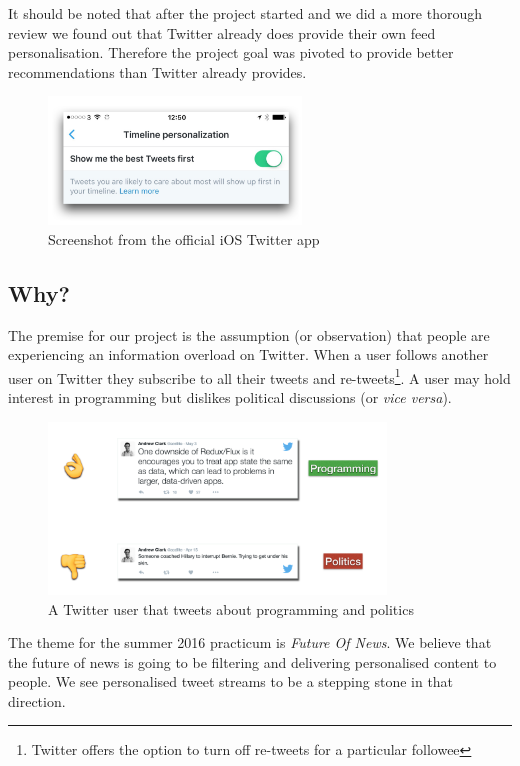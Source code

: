 \documentclass{article}
\begin{document}
\noindent It should be noted that after the project started and we did a more thorough review we found out that Twitter already does provide their own feed personalisation. Therefore the project goal was pivoted to provide better recommendations than Twitter already provides.

\begin{figure}[H]
    \centering
    \includegraphics[width=0.6\textwidth]{tp}  
    \caption{Screenshot from the official iOS Twitter app}
\end{figure}


\subsection{Why?}
The premise for our project is the assumption (or observation) that people are experiencing an information overload on Twitter. When a user follows another user on Twitter they subscribe to all their tweets and re-tweets\footnote{Twitter offers the option to turn off re-tweets for a particular followee}. A user may hold interest in programming but dislikes political discussions (or \textit{vice versa}).

\begin{figure}[H]
    \centering
    \includegraphics[width=0.8\textwidth]{the_problem}  
    \caption{A Twitter user that tweets about programming and politics}
\end{figure}

The theme for the summer 2016 practicum is \textit{Future Of News}. We believe that the future of news is going to be filtering and delivering personalised content to people. We see personalised tweet streams to be a stepping stone in that direction.
\end{document}
